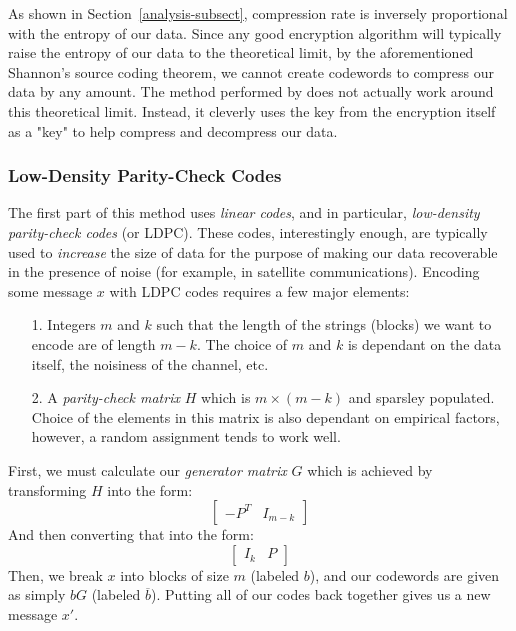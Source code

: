 \documentclass[11pt]{article}
\newcommand\genref{}
\newcommand\sectref{}
\def\genref#1#2{#1~\ref{#2}}
\def\sectref#1{\genref{Section}{#1}}
\begin{document}
As shown in \sectref{analysis-subsect}, compression rate is inversely proportional with the entropy of our data. 
Since any good encryption algorithm will typically raise the entropy of our data to the theoretical limit, 
by the aforementioned Shannon's source coding theorem, we cannot create codewords to compress 
our data by any amount. The method performed by \cite{johnson} does not actually work around 
this theoretical limit. Instead, it cleverly uses the key from the encryption itself as a "key" to help compress and 
decompress our data. 

\subsubsection{Low-Density Parity-Check Codes}\label{ldpc-subsubsect}
The first part of this method uses \emph{linear codes}, and in particular, 
\emph{low-density parity-check codes} (or LDPC)\cite{gallager}.
These codes, interestingly enough, are typically used to \emph{increase} the size of data for the purpose of 
making our data recoverable in the presence of noise (for example, in satellite communications). 
Encoding some message $x$ with LDPC codes requires a few major elements: 
\begin{itemize}
	\item[1.]Integers $m$ and $k$ such that the length of the strings (blocks) we want to encode are of length $m-k$. 
The choice of $m$ and $k$ is dependant on the data itself, the noisiness of the channel, etc. 
	\item[2.]A \emph{parity-check matrix} $H$ which is $m\times (m-k)$ and sparsley populated. 
Choice of the elements in this matrix is also dependant on empirical factors, however, a random assignment tends to work well. 
\end{itemize}
First, we must calculate our \emph{generator matrix} $G$ which is achieved by transforming $H$ into the form:
\[ \left[
\begin{array}{c|c}
	-P^T & I_{m-k}
\end{array}
\right] \]
And then converting that into the form: 
\[ \left[
\begin{array}{c|c}
	I_k & P
\end{array}
\right] \]
Then, we break $x$ into blocks of size $m$ (labeled $b$), and our codewords are given as simply $bG$ (labeled $\overline{b}$). 
Putting all of our codes back together gives us a new message $x'$.
\end{document}
